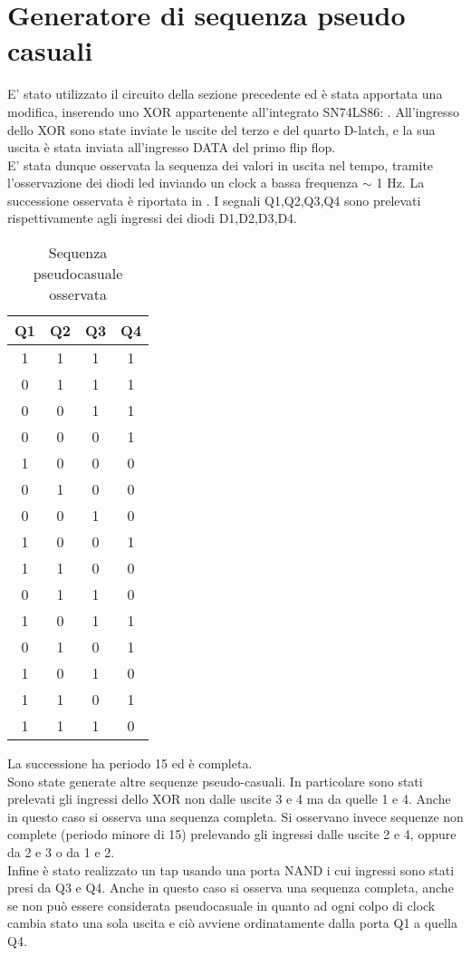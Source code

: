 \section{Generatore di sequenza pseudo casuali}
E' stato utilizzato il circuito della sezione precedente ed è stata apportata una modifica, inserendo uno XOR appartenente all'integrato SN74LS86: . All'ingresso dello XOR sono state inviate le uscite del terzo e del quarto D-latch, e la sua uscita è stata inviata all'ingresso DATA del primo flip flop.\\
E' stata dunque osservata la sequenza dei valori in uscita nel tempo, tramite l'osservazione dei diodi led inviando un clock a bassa frequenza $\sim$ 1 Hz. La successione osservata è riportata in . I segnali Q1,Q2,Q3,Q4 sono prelevati rispettivamente agli ingressi dei diodi D1,D2,D3,D4.

\begin{table}[h]
	\centering
	\begin{tabular}{cccc}
		Q1 & Q2 & Q3 & Q4 \\
		\midrule
		 1 & 1 & 1 & 1\\
		 0 & 1 & 1 & 1\\
		 0 & 0 & 1 & 1\\
		 0 & 0 & 0 & 1\\
		 1 & 0 & 0 & 0\\
	 	 0 & 1 & 0 & 0\\
	 	 0 & 0 & 1 & 0\\
	 	 1 & 0 & 0 & 1\\
	 	 1 & 1 & 0 & 0\\
	 	 0 & 1 & 1 & 0\\
	 	 1 & 0 & 1 & 1\\
	 	 0 & 1 & 0 & 1\\
	 	 1 & 0 & 1 & 0\\
	 	 1 & 1 & 0 & 1\\
	 	 1 & 1 & 1 & 0\\
		 
 	\end{tabular}
	\caption{ Sequenza pseudocasuale osservata }
	\label{t:sequenza}
\end{table} 
La successione ha periodo 15 ed è completa.\\
Sono state generate altre sequenze pseudo-casuali. In particolare sono stati prelevati gli ingressi dello XOR non dalle uscite 3 e 4 ma da quelle 1 e 4. Anche in questo caso si osserva una sequenza completa. Si osservano invece sequenze non complete (periodo minore di 15) prelevando gli ingressi dalle uscite 2 e 4, oppure da 2 e 3 o da 1 e 2.\\
Infine è stato realizzato un tap usando una porta NAND i cui ingressi sono stati presi da Q3 e Q4. Anche in questo caso si osserva una sequenza completa, anche se non può essere considerata pseudocasuale in quanto ad ogni colpo di clock cambia stato una sola uscita e ciò avviene ordinatamente dalla porta Q1 a quella Q4.

